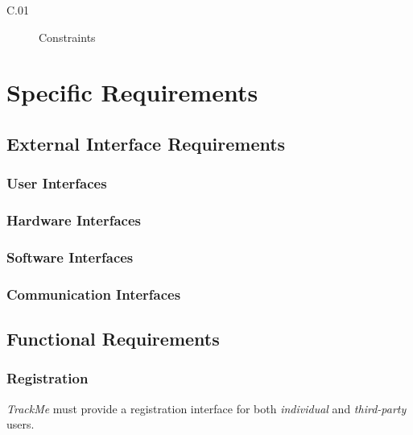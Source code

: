 \documentclass[a4paper]{article}
\begin{document}
        \begin{description}
            \item[C.01] Constraints
        \end{description}
\newpage
\section{Specific Requirements}

    \subsection{External Interface Requirements}
        
        \subsubsection{User Interfaces}
        
        \subsubsection{Hardware Interfaces}
        
        \subsubsection{Software Interfaces}
        
        \subsubsection{Communication Interfaces}
    
    \subsection{Functional Requirements}
        
        \subsubsection{Registration}
        \textit{TrackMe} must provide a registration interface for both \textit{individual} and \textit{third-party} users.
        
\end{document}
